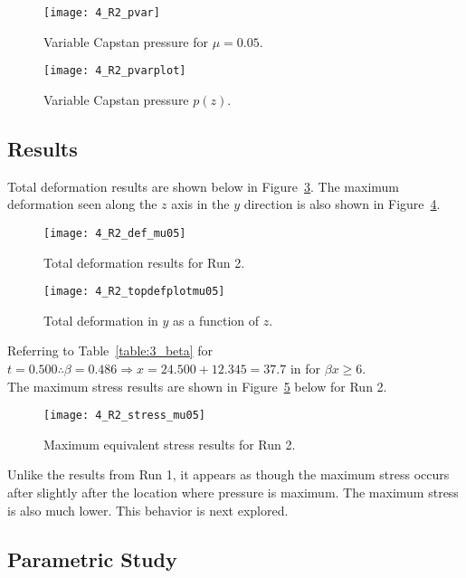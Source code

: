 \begin{figure}[H]
	\centering
	\texttt{[image: 4\_R2\_pvar]}
	\caption{Variable Capstan pressure for $\mu=0.05$.}
	\label{fig:4_R2_pvar}
\end{figure}
\begin{figure}[H]
	\centering
	\texttt{[image: 4\_R2\_pvarplot]}
	\caption{Variable Capstan pressure $p(z)$.}
	\label{fig:4_R2_pvarplot}
\end{figure}

\subsection{Results}

Total deformation results are shown below in Figure~\ref{fig:4_R2_def_mu05}. The maximum deformation seen along the $z$ axis in the $y$ direction is also shown in Figure~\ref{fig:4_R2_topdefplotmu05}.

\begin{figure}[H]
	\centering
 	\texttt{[image: 4\_R2\_def\_mu05]}
 	\caption{Total deformation results for Run 2.}
 	\label{fig:4_R2_def_mu05}
 \end{figure}
 
 \begin{figure}[H]
 	\centering
 \texttt{[image: 4\_R2\_topdefplotmu05]}
 	\caption{Total deformation in $y$ as a function of $z$.}
 	\label{fig:4_R2_topdefplotmu05}
 \end{figure}
 
Referring to Table~\ref{table:3_beta} for $t=0.500 \therefore \beta = 0.486 \Rightarrow x= 24.500+12.345 = 37.7$ in for $\beta x \geq 6$.\\

The maximum stress results are shown in Figure~\ref{fig:4_R2_stress_mu05} below for Run 2.

\begin{figure}[H]
	\centering
	\texttt{[image: 4\_R2\_stress\_mu05]}
	\caption{Maximum equivalent stress results for Run 2.}
	\label{fig:4_R2_stress_mu05}
\end{figure}

Unlike the results from Run 1, it appears as though the maximum stress occurs after slightly after the location where pressure is maximum. The maximum stress is also much lower. This behavior is next explored.

\subsection{Parametric Study}

